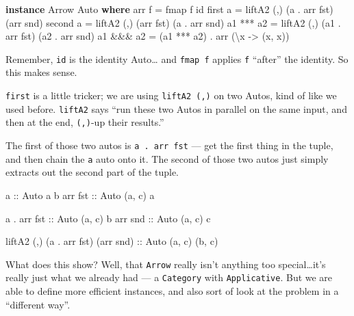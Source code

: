 \documentclass[]{article}
\newenvironment{Shaded}{}{}
\newcommand{\KeywordTok}[1]{\textcolor[rgb]{0.00,0.44,0.13}{\textbf{{#1}}}}
\newcommand{\DataTypeTok}[1]{\textcolor[rgb]{0.56,0.13,0.00}{{#1}}}
\newcommand{\OtherTok}[1]{\textcolor[rgb]{0.00,0.44,0.13}{{#1}}}
\newcommand{\FunctionTok}[1]{\textcolor[rgb]{0.02,0.16,0.49}{{#1}}}
\newcommand{\NormalTok}[1]{{#1}}
\begin{document}
\begin{Shaded}
\begin{Highlighting}[]
\KeywordTok{instance} \DataTypeTok{Arrow} \DataTypeTok{Auto} \KeywordTok{where}
    \NormalTok{arr f     }\FunctionTok{=} \NormalTok{fmap f id}
    \NormalTok{first a   }\FunctionTok{=} \NormalTok{liftA2 (,) (a  }\FunctionTok{.} \NormalTok{arr fst) (arr snd)}
    \NormalTok{second a  }\FunctionTok{=} \NormalTok{liftA2 (,) (arr fst)      (a  }\FunctionTok{.} \NormalTok{arr snd)}
    \NormalTok{a1 }\FunctionTok{***} \NormalTok{a2 }\FunctionTok{=} \NormalTok{liftA2 (,) (a1 }\FunctionTok{.} \NormalTok{arr fst) (a2 }\FunctionTok{.} \NormalTok{arr snd)}
    \NormalTok{a1 }\FunctionTok{&&&} \NormalTok{a2 }\FunctionTok{=} \NormalTok{(a1 }\FunctionTok{***} \NormalTok{a2) }\FunctionTok{.} \NormalTok{arr (\textbackslash{}x }\OtherTok{->} \NormalTok{(x, x))}
\end{Highlighting}
\end{Shaded}

Remember, \texttt{id} is the identity Auto\ldots{} and \texttt{fmap\ f} applies
\texttt{f} ``after'' the identity. So this makes sense.

\texttt{first} is a little tricker; we are using \texttt{liftA2\ (,)} on two
Autos, kind of like we used before. \texttt{liftA2} says ``run these two Autos
in parallel on the same input, and then at the end, \texttt{(,)}-up their
results.''

The first of those two autos is \texttt{a\ .\ arr\ fst} --- get the first thing
in the tuple, and then chain the \texttt{a} auto onto it. The second of those
two autos just simply extracts out the second part of the tuple.

\begin{Shaded}
\begin{Highlighting}[]
\OtherTok{a           ::} \DataTypeTok{Auto} \NormalTok{a b}
\NormalTok{arr}\OtherTok{ fst     ::} \DataTypeTok{Auto} \NormalTok{(a, c) a}

\NormalTok{a }\FunctionTok{.} \NormalTok{arr}\OtherTok{ fst ::} \DataTypeTok{Auto} \NormalTok{(a, c) b}
\NormalTok{arr}\OtherTok{ snd     ::} \DataTypeTok{Auto} \NormalTok{(a, c) c}

\NormalTok{liftA2 (,) (a }\FunctionTok{.} \NormalTok{arr fst) (arr snd)}\OtherTok{ ::} \DataTypeTok{Auto} \NormalTok{(a, c) (b, c)}
\end{Highlighting}
\end{Shaded}

What does this show? Well, that \texttt{Arrow} really isn't anything too
special\ldots{}it's really just what we already had --- a \texttt{Category} with
\texttt{Applicative}. But we are able to define more efficient instances, and
also sort of look at the problem in a ``different way''.
\end{document}
